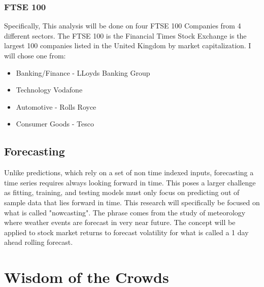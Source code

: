 \subsubsection{FTSE 100}
 Specifically, This analysis will be done on four FTSE 100 Companies from 4 different sectors. The FTSE 100 is the Financial Times Stock Exchange is the largest 100 companies listed in the United Kingdom by market capitalization. I will chose one from: \begin{itemize}
    \item Banking/Finance - LLoyds Banking Group
    \item Technology Vodafone
    \item Automotive - Rolls Royce
    \item Consumer Goods - Tesco
\end{itemize}

\subsection{Forecasting}
Unlike predictions, which rely on a set of non time indexed inputs, forecasting a time series requires always looking forward in time. This poses a larger challenge as fitting, training, and testing models must only focus on predicting out of sample data that lies forward in time. This research will specifically be focused on what is called "nowcasting". The phrase comes from the study of meteorology where weather events are forecast in very near future. The concept will be applied to stock market returns to forecast volatility for what is called a 1 day ahead rolling forecast. 

\section{Wisdom of the Crowds}
